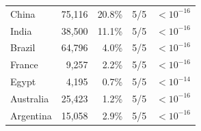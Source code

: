 \begin{table}[H]
\begin{tabular}{lrrcc}
        China & 75,116 & 20.8\% & 5/5 & $<10^{-16}$ \\
        India & 38,500 & 11.1\% & 5/5 & $<10^{-16}$ \\
        Brazil & 64,796 & 4.0\% & 5/5 & $<10^{-16}$ \\
        France & 9,257 & 2.2\% & 5/5 & $<10^{-16}$ \\
        Egypt & 4,195 & 0.7\% & 5/5 & $<10^{-14}$ \\
        Australia & 25,423 & 1.2\% & 5/5 & $<10^{-16}$ \\
        Argentina & 15,058 & 2.9\% & 5/5 & $<10^{-16}$ \\
        \bottomrule
    \end{tabular}
\end{table}
